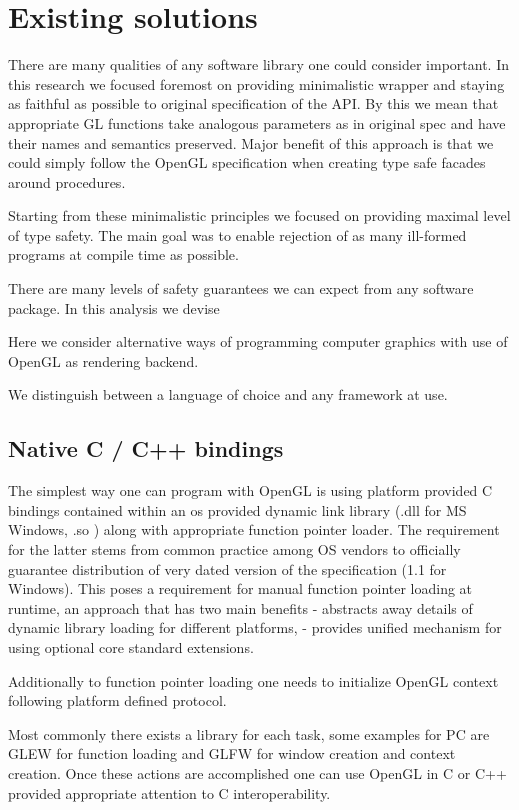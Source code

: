 \chapter{Existing solutions}

There are many qualities of any software library one could consider important.
In this research we focused foremost on providing minimalistic wrapper and staying as faithful as possible to original specification of the API.
By this we mean that appropriate GL functions take analogous parameters as in original spec and have their names and semantics preserved.
Major benefit of this approach is that we could simply follow the OpenGL specification when creating type safe facades around procedures.

Starting from these minimalistic principles we focused on providing maximal level of type safety. The main goal was to enable rejection of as many ill-formed programs at compile time as possible.

There are many levels of safety guarantees we can expect from any software package.
In this analysis we devise 

Here we consider alternative ways of programming computer graphics with use of OpenGL as rendering backend.

We distinguish between a language of choice and any framework at use. 

\section{Native C / C++ bindings}

The simplest way one can program with OpenGL is using platform provided C bindings contained within an os provided dynamic link library (.dll for MS Windows, .so ) along with appropriate function pointer loader.
The requirement for the latter stems from common practice among OS vendors to officially guarantee distribution of very dated version of the specification (1.1 for Windows).
This poses a requirement for manual function pointer loading at runtime, an approach that has two main benefits
- abstracts away details of dynamic library loading for different platforms, 
- provides unified mechanism for using optional core standard extensions.

Additionally to function pointer loading one needs to initialize OpenGL context following platform defined protocol.

Most commonly there exists a library for each task, some examples for PC are GLEW for function loading and GLFW for window creation and context creation.
Once these actions are accomplished one can use OpenGL in C or C++ provided appropriate attention to C interoperability.


